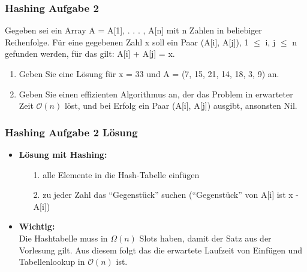\begin{frame}
	\frametitle{Hashing Aufgabe 2}
	Gegeben sei ein Array A = A[1], . . . , A[n] mit n Zahlen in beliebiger Reihenfolge.
	Für eine gegebenen Zahl x soll ein Paar (A[i], A[j]), 1 $\leq$ i, j $\leq$ n gefunden werden, für das
	gilt: A[i] + A[j] = x.

	\begin{enumerate}
		\item Geben Sie eine Lösung für x = 33 und A = (7, 15, 21, 14, 18, 3, 9) an.
		\item Geben Sie einen effizienten Algorithmus an, der das Problem in erwarteter Zeit $\mathcal{O}(n)$ löst, und bei Erfolg ein Paar (A[i], A[j]) ausgibt, ansonsten Nil.
	\end{enumerate}
\end{frame}


\begin{frame}
	\frametitle{Hashing Aufgabe 2 Lösung}
	\begin{itemize}
		\item \textbf{Lösung mit Hashing:} 
		\begin{itemize}
			\item[1.] alle Elemente in die Hash-Tabelle einfügen
			\item[2.] zu jeder Zahl das "`Gegenstück"' suchen  ("`Gegenstück"' von A[i] ist x - A[i])
		\end{itemize}
		\item \textbf{Wichtig:} \\ Die Hashtabelle muss in $\Omega (n)$ Slots haben, damit der Satz aus der Vorlesung gilt.
Aus diesem folgt das die erwartete Laufzeit von Einfügen und Tabellenlookup in $\mathcal{O}(n)$ ist.
	\end{itemize}
\end{frame}

